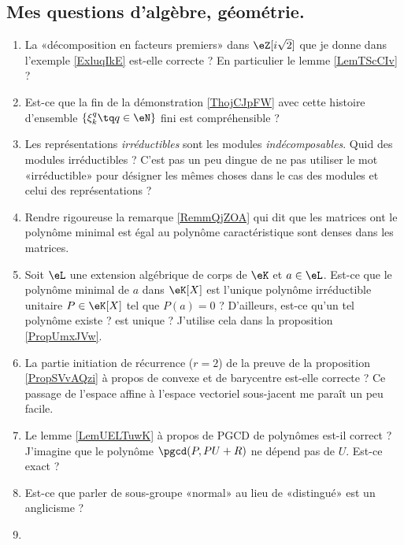 \subsection{Mes questions d'algèbre, géométrie.}

\begin{enumerate}
    \item
        La «décomposition en facteurs premiers» dans \( \eZ[i\sqrt{2}]\) que je donne dans l'exemple \ref{ExluqIkE} est-elle correcte ? En particulier le lemme \ref{LemTScCIv} ?
    \item
        Est-ce que la fin de la démonstration \ref{ThojCJpFW} avec cette histoire d'ensemble \( \{ \xi_k^q\tq q\in \eN \}\) fini est compréhensible ?
    \item
        Les représentations \emph{irréductibles} sont les modules \emph{indécomposables}. Quid des modules irréductibles ? C'est pas un peu dingue de ne pas utiliser le mot «irréductible» pour désigner les mêmes choses dans le cas des modules et celui des représentations ?
    \item
        Rendre rigoureuse la remarque \eqref{RemmQjZOA} qui dit que les matrices ont le polynôme minimal est égal au polynôme caractéristique sont denses dans les matrices.
    \item
        Soit \( \eL\) une extension algébrique de corps de \( \eK\) et \( a\in \eL\). Est-ce que le polynôme minimal de \( a\) dans \( \eK[X]\) est l'unique polynôme irréductible unitaire \( P\in \eK[X]\) tel que \( P(a)=0\) ? D'ailleurs, est-ce qu'un tel polynôme existe ? est unique ? J'utilise cela dans la proposition \ref{PropUmxJVw}.
    \item
        La partie initiation de récurrence (\( r=2\)) de la preuve de la proposition \ref{PropSVvAQzi} à propos de convexe et de barycentre est-elle correcte ? Ce passage de l'espace affine à l'espace vectoriel sous-jacent me paraît un peu facile.
    \item
        Le lemme \ref{LemUELTuwK} à propos de PGCD de polynômes est-il correct ? J'imagine que le polynôme \( \pgcd(P,PU+R)\) ne dépend pas de \( U\). Est-ce exact ?
    \item
        Est-ce que parler de sous-groupe «normal» au lieu de «distingué» est un anglicisme ?
    \item

\end{enumerate}
